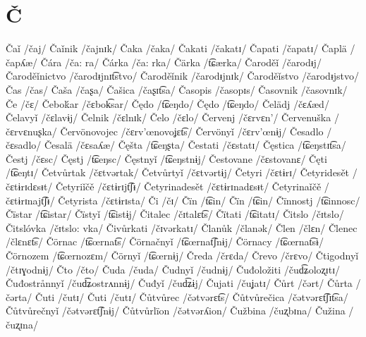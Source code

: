 \chapter{Č}

Čaǐ /čaj/
Čaǐnik /čajnɪk/
Čaka /čaka/
Čakati /čakatɪ/
Čapati /čapatɪ/
Čaplä /čapʎæ/
Čára /ča: ra/
Čárka /ča: rka/
Čärka /t͡ɕærka/
Čaroděǐ /čarodᵻj/
Čaroděǐnictvo /čarodᵻjnɪt͡stvo/
Čaroděǐnik /čarodᵻjnɪk/
Čaroděǐstvo /čarodᵻjstvo/
Čas /čas/
Čaša /čaʂa/
Čašica /čaʂɪt͡sa/
Časopis /časopɪs/
Časovnik /časovnɪk/
Če /čɛ/
Čeboḱar /čɛbok͡sar/
Čędo /t͡ɕeŋdo/
Čędo /t͡ɕeŋdo/
Čelädj /čɛʎæd/
Čelavyǐ /čɛlavɨj/
Čelnik /čɛlnɪk/
Čelo /čɛlo/
Červenj /čɛrvɛn’/
Červenuška /čɛrvɛnuʂka/
Červönovojec /čɛrv’œnovoʝɛt͡s/
Červönyǐ /čɛrv’œnɨj/
Česadlo /čɛsadlo/
Česalä /čɛsaʎæ/
Čęšta /t͡ɕeŋʂta/
Čestati /čɛstatɪ/
Čęstica /t͡ɕeŋstɪt͡sa/
Čestj /čɛsc/
Čęstj /t͡ɕeŋsc/
Čęstnyǐ /t͡ɕeŋstnɨj/
Čestovane /čɛstovanɛ/
Čęti /t͡ɕeŋtɪ/
Četvůrtak /čɛtvərtak/
Četvůrtyǐ /čɛtvərtɨj/
Četyri /čɛtɨrɪ/
Četyridesět /čɛtɨrɪdɛsᵻt/
Četyriǐčě /čɛtɨrɪjt͡ʃᵻ/
Četyrinadesět /čɛtɨrɪnadɛsᵻt/
Četyrinaǐčě /čɛtɨrɪnajt͡ʃᵻ/
Četyrista /čɛtɨrɪsta/
Či /čɪ/
Čïn /t͡ɕin/
Čïn /t͡ɕin/
Čïnnostj /t͡ɕinnosc/
Čïstar /t͡ɕistar/
Čïstyǐ /t͡ɕistɨj/
Čitalec /čɪtalɛt͡s/
Čïtati /t͡ɕitatɪ/
Čitslo /čɪtslo/
Čitslóvka /čɪtslo: vka/
Čivůrkati /čɪvərkatɪ/
Članůk /članək/
Člen /člɛn/
Členec /člɛnɛt͡s/
Čörnac /t͡ɕœrnat͡s/
Čörnačnyǐ /t͡ɕœrnat͡ʃnɨj/
Čörnacy /t͡ɕœrnat͡sɨ/
Čörnozem /t͡ɕœrnozɛm/
Čörnyǐ /t͡ɕœrnɨj/
Čreda /črɛda/
Črevo /črɛvo/
Čtigodnyǐ /čtɪɣodnɨj/
Čto /čto/
Čuda /čuda/
Čudnyǐ /čudnɨj/
Čuđoložiti /čud͡ʑoloʐɪtɪ/
Čuđostrånnyǐ /čud͡ʑostrʌnnɨj/
Čuđyǐ /čud͡ʑɨj/
Čujati /čuʝatɪ/
Čůrt /čərt/
Čůrta /čərta/
Čuti /čutɪ/
Čuti /čutɪ/
Čůtvůrec /čətvərɛt͡s/
Čůtvůrečica /čətvərɛt͡ʃɪt͡sa/
Čůtvůrečnyǐ /čətvərɛt͡ʃnɨj/
Čůtvůrlïon /čətvərʎion/
Čužbina /čuʐbɪna/
Čužina /čuʐɪna/